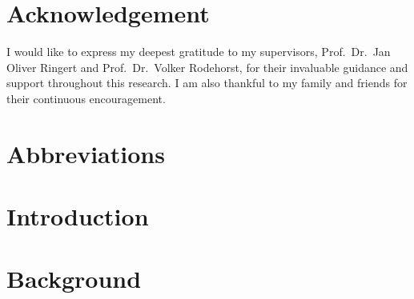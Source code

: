 \clearpage
\thispagestyle{empty}
\null
\clearpage

\chapter*{Acknowledgement}
I would like to express my deepest gratitude to my supervisors, Prof.\ Dr.\ Jan Oliver Ringert and Prof.\ Dr.\ Volker Rodehorst, for their invaluable guidance and support throughout this research. I am also thankful to my family and friends for their continuous encouragement.
\clearpage
\thispagestyle{empty}
\null
\clearpage

\tableofcontents
\cleardoublepage

\listoffigures
\cleardoublepage

\listoftables
\cleardoublepage

\chapter*{Abbreviations}

\cleardoublepage


\printnomenclature
\cleardoublepage


\cleardoublepage
\chapter{Introduction} \label{Introduction}


\cleardoublepage
\chapter{Background} \label{Background}


